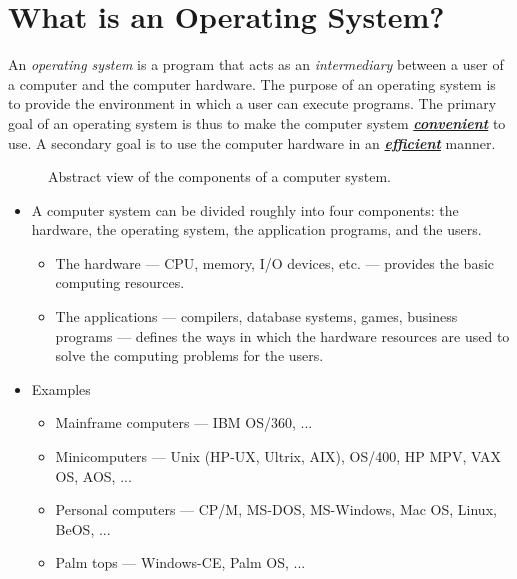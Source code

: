 %

\chapter{What is an Operating System?}

An {\it operating system\/} is a program that acts as an 
\textit{intermediary\/} between a user of a computer and the computer hardware. 
The purpose of an operating system is to provide the environment in which
a user can execute programs. The primary goal of an operating system
is thus to make the computer system \underline{\textbf{\textit{convenient}}}
to use. A secondary goal is to use the computer hardware in
an \underline{\textbf{\textit{efficient}}} manner.

%


\newpage

\begin{figure}
\centerline{}
\caption{Abstract view of the components of a computer system.}
\label{fig:level}
\end{figure}

\vskip 1cm
\begin{itemize}
\item   A computer system can be divided roughly into four components:
        the hardware, the operating system, the application programs,
        and the users.

        \begin{itemize}
        \item   The hardware --- CPU, memory, I/O devices, etc.
                --- provides the basic computing resources.
        \item   The applications --- compilers, database systems, games,
                business programs --- defines the ways in which
                the hardware resources are used to solve the computing
                problems for the users.
        \end{itemize}

\item	Examples
	\begin{itemize}
	\item	Mainframe computers --- IBM OS/360, ...
	\item	Minicomputers --- Unix (HP-UX, Ultrix, AIX),
		OS/400, HP MPV, VAX OS, AOS, ... 
	\item	Personal computers --- CP/M, MS-DOS, MS-Windows, Mac OS,
			Linux, BeOS, ...
	\item	Palm tops --- Windows-CE, Palm OS, ...
	\end{itemize}
				

\end{itemize}



